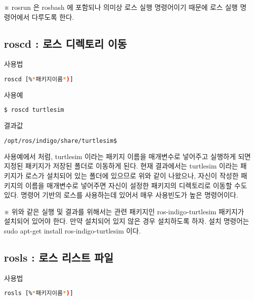 \noindent
※ rosrun 은 rosbash 에 포함되나 의미상 로스 실행 명령어이기 때문에 로스 실행 명령어에서 다루도록 한다.

\subsection{roscd : 로스 디렉토리 이동}

\setcounter{num}{0}

\circled{\thenum} 사용법
\begin{lstlisting}[language=bash]
roscd [%*패키지이름*)]
\end{lstlisting}

\noindent
{}\circled{\thenum} 사용예
\begin{lstlisting}[language=bash]
$ roscd turtlesim
\end{lstlisting}

\noindent
{}\circled{\thenum} 결과값
\begin{lstlisting}[language=bash]
/opt/ros/indigo/share/turtlesim$
\end{lstlisting}

\vspace{\baselineskip}
\noindent
사용예에서 처럼, turtlesim 이라는 패키지 이름을 매개변수로 넣어주고 실행하게 되면 지정된 패키지가 저장된 폴더로 이동하게 된다. 현재 결과에서는 turtlesim 이라는 패키지가 로스가 설치되어 있는 폴더에 있으므로 위와 같이 나왔으나, 자신이 작성한 패키지의 이름을 매개변수로 넣어주면 자신이 설정한 패키지의 디렉토리로 이동할 수도 있다. 명령어 기반의 로스를 사용하는데 있어서 매우 사용빈도가 높은 명령어이다.

\vspace{\baselineskip}
\noindent
※ 위와 같은 실행 및 결과를 위해서는 관련 패키지인 ros-indigo-turtlesim 패키지가 설치되어 있어야 한다. 만약 설치되어 있지 않은 경우 설치하도록 하자. 설치 명령어는 sudo apt-get install ros-indigo-turtlesim  이다.

\subsection{rosls : 로스 리스트 파일}

\setcounter{num}{0}

\circled{\thenum} 사용법
\begin{lstlisting}[language=bash]
rosls [%*패키지이름*)]
\end{lstlisting}

